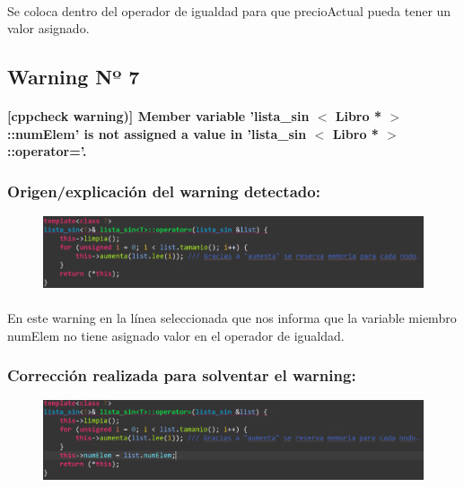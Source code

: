 			\paragraph{}Se coloca dentro del operador de igualdad para que precioActual pueda tener un valor asignado.
			
	\subsection{Warning Nº 7}
	
		\paragraph{[cppcheck warning)] Member variable 'lista\_sin $<$ Libro * $>$::numElem' is not assigned a value in 'lista\_sin $<$ Libro * $>$::operator='.}
		
		\subsubsection{Origen/explicación del warning detectado:}
		
			\begin{figure}[H]
				\centering
				\includegraphics[scale=0.55]{img/esteban6.png}
				\label{esteban6}
			\end{figure}
		
			\paragraph{}En este warning en la línea seleccionada que nos informa que la variable miembro numElem no tiene asignado valor en el operador de igualdad.
			
		\subsubsection{Corrección realizada para solventar el warning:}
		
			\begin{figure}[H]
				\centering
				\includegraphics[scale=0.55]{img/esteban7.png}
				\label{esteban7}
			\end{figure}
		
